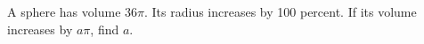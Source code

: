 A sphere has volume $36\pi$. Its radius increases by 100 percent. If its volume increases by $a\pi$, find $a$.
